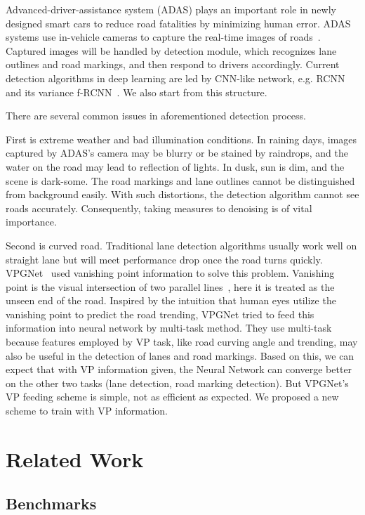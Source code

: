 \begin{spacing}{1.5}
Advanced-driver-assistance system (ADAS) plays an important role in newly designed smart cars to reduce road fatalities by minimizing human error. ADAS systems use in-vehicle cameras to capture the real-time images of roads~\cite{ziebinski2016survey}. Captured images will be handled by detection module, which recognizes lane outlines and road markings, and then respond to drivers accordingly. Current detection algorithms in deep learning are led by CNN-like network, e.g. RCNN~\cite{girshick2014rich} and its variance f-RCNN~\cite{girshick2015fast}. We also start from this structure.

There are several common issues in aforementioned detection process. 

First is extreme weather and bad illumination conditions. In raining days, images captured by ADAS’s camera may be blurry or be stained by raindrops, and the water on the road may lead to reflection of lights. In dusk, sun is dim, and the scene is dark-some. The road markings and lane outlines cannot be distinguished from background easily. With such distortions, the detection algorithm cannot see roads accurately. Consequently, taking measures to denoising is of vital importance. 

Second is curved road. Traditional lane detection algorithms usually work well on straight lane but will meet performance drop once the road turns quickly. VPGNet~\cite{lee2017vpgnet} used vanishing point information to solve this problem. Vanishing point is the visual intersection of two parallel lines~\cite{barnard1983interpreting}, here it is treated as the unseen end of the road.  Inspired by the intuition that human eyes utilize the vanishing point to predict the road trending, VPGNet tried to feed this information into neural network by multi-task method. They use multi-task because features employed by VP task, like road curving angle and trending, may also be useful in the detection of lanes and road markings. Based on this, we can expect that with VP information given, the Neural Network can converge better on the other two tasks (lane detection, road marking detection). But VPGNet’s VP feeding scheme is simple, not as efficient as expected. We proposed a new scheme to train with VP information.

\section{Related Work}


\subsection{Benchmarks}


\end{spacing}
